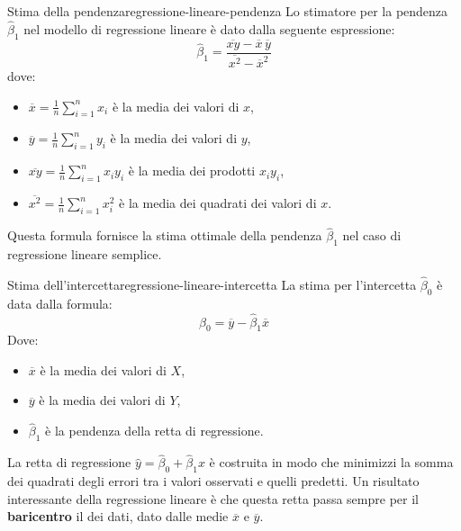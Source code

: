 \begin{definizione}[
    enhanced,
    overlay last={
        \node[anchor=south east, font=\large, text=cs@definition] at (frame.south east) {$\bigstar$};
    }
]{Stima della pendenza}{regressione-lineare-pendenza}
    Lo stimatore per la pendenza \( \hat{\beta}_1 \) nel modello di regressione lineare è dato dalla seguente espressione:
    \[
        \hat{\beta}_1 = \frac{\overline{xy} - \overline{x}\, \overline{y}}{\overline{x^2} - \overline{x}^2}
    \]
    dove:
    \begin{itemize}
        \item \( \overline{x} = \frac{1}{n} \sum_{i=1}^n x_i \) è la media dei valori di \( x \),
        \item \( \overline{y} = \frac{1}{n} \sum_{i=1}^n y_i \) è la media dei valori di \( y \),
        \item \( \overline{xy} = \frac{1}{n} \sum_{i=1}^n x_i y_i \) è la media dei prodotti \( x_i y_i \),
        \item \( \overline{x^{2}} = \frac{1}{n} \sum_{i=1}^n x_i^2 \) è la media dei quadrati dei valori di \( x \).
    \end{itemize}
\end{definizione}
Questa formula fornisce la stima ottimale della pendenza \( \hat{\beta}_1 \) nel
caso di regressione lineare semplice.

\begin{definizione}[
    enhanced,
    overlay last={
        \node[anchor=south east, font=\large, text=cs@definition] at (frame.south east) {$\bigstar$};
    }
]{Stima dell'intercetta}{regressione-lineare-intercetta}
    La stima per l'intercetta \( \hat{\beta}_0 \) è data dalla formula:
    \[
        \hat{\beta}_0 = \overline{y} - \hat{\beta}_1 \overline{x}
    \]
    Dove:
    \begin{itemize}
        \item \( \overline{x} \) è la media dei valori di \( X \),
        \item \( \overline{y} \) è la media dei valori di \( Y \),
        \item \( \hat{\beta}_1 \) è la pendenza della retta di regressione.
    \end{itemize}
\end{definizione}

La retta di regressione \( \hat{y} = \hat{\beta}_0 + \hat{\beta}_1 x \) è costruita in modo che minimizzi la somma dei quadrati degli errori tra i valori osservati e quelli predetti. Un risultato interessante della regressione lineare è che questa retta passa sempre per il \textbf{baricentro} il  dei dati, dato dalle medie \( \overline{x} \) e \( \overline{y} \).

